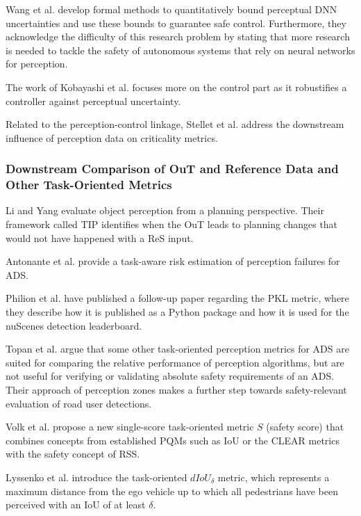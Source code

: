 \documentclass[conference]{IEEEtran}
\newcommand{\new}[1]{{\color{my-red}#1}}
\begin{document}
Wang et al. \cite{Wang2021bounding} develop formal methods to quantitatively bound perceptual DNN uncertainties and use these bounds to guarantee safe control. 
Furthermore, they acknowledge the difficulty of this research problem by stating that more research is needed to tackle the safety of autonomous systems that rely on neural networks for perception. 

The work of Kobayashi et al. \cite{Kobayashi2021} focuses more on the control part as it robustifies a controller against perceptual uncertainty.


Related to the perception-control linkage, Stellet et al. \cite{Stellet2015propagation} address the downstream influence of perception data on criticality metrics.



\subsubsection{Downstream Comparison of \new{OuT} and Reference Data \new{and Other Task-Oriented Metrics}}
\label{sec:downstream_comparison}

Li and Yang \cite{Li2023_Transcendental} evaluate object perception from a planning perspective. Their framework called TIP identifies when the OuT leads to planning changes that would not have happened with a ReS input.

Antonante et al. \cite{Antonante2023task_aware} provide a task-aware risk estimation of perception failures for ADS.

Philion et al. \cite{Philion2020implementingPKL} have published a follow-up paper regarding the PKL metric, where they describe how it is published as a Python package and how it is used for the nuScenes detection leaderboard.

Topan et al. \cite{Topan2022zones} argue that some other task-oriented perception metrics for ADS are suited for comparing the relative performance of perception algorithms, but are not useful for verifying or validating absolute safety requirements of an ADS. Their approach of perception zones makes a further step towards safety-relevant evaluation of road user detections.

Volk et al. \cite{Volk2020metric} propose a new single-score task-oriented metric $S$ (safety score) that combines concepts from established PQMs such as IoU or the CLEAR metrics with the safety concept of RSS. 

Lyssenko et al. \cite{Lyssenko2021relevance} introduce the task-oriented $dIoU_\delta$ metric, which represents a maximum distance from the ego vehicle up to which all pedestrians have been perceived with an IoU of at least $\delta$. 
\end{document}
